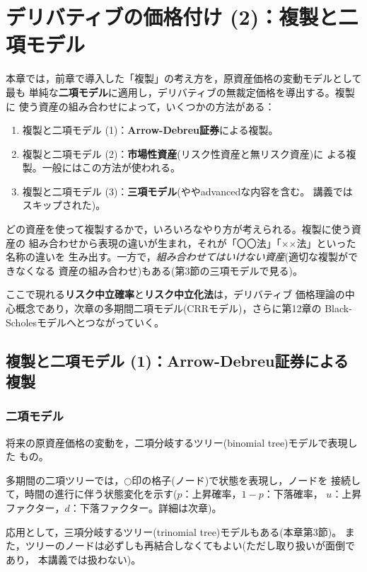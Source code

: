 \chapter{デリバティブの価格付け (2)：複製と二項モデル}

本章では，前章で導入した「複製」の考え方を，原資産価格の変動モデルとして最も
単純な\textbf{二項モデル}に適用し，デリバティブの無裁定価格を導出する。複製に
使う資産の組み合わせによって，いくつかの方法がある：
\begin{enumerate}
\item 複製と二項モデル (1)：\textbf{Arrow-Debreu証券}による複製。
\item 複製と二項モデル (2)：\textbf{市場性資産}(リスク性資産と無リスク資産)に
よる複製。一般にはこの方法が使われる。
\item 複製と二項モデル (3)：\textbf{三項モデル}(ややadvancedな内容を含む。
講義ではスキップされた)。
\end{enumerate}
どの資産を使って複製するかで，いろいろなやり方が考えられる。複製に使う資産の
組み合わせから表現の違いが生まれ，それが「〇〇法」「××法」といった名称の違いを
生み出す。一方で，\emph{組み合わせてはいけない資産}(適切な複製ができなくなる
資産の組み合わせ)もある(第3節の三項モデルで見る)。

ここで現れる\textbf{リスク中立確率}と\textbf{リスク中立化法}は，デリバティブ
価格理論の中心概念であり，次章の多期間二項モデル(CRRモデル)，さらに第12章の
Black-Scholesモデルへとつながっていく。

\section{複製と二項モデル (1)：Arrow-Debreu証券による複製}

\subsection{二項モデル}

\begin{definition}[二項モデル]
将来の原資産価格の変動を，二項分岐するツリー(binomial tree)モデルで表現した
もの。
\end{definition}

多期間の二項ツリーでは，$\bigcirc$印の格子(ノード)で状態を表現し，ノードを
接続して，時間の進行に伴う状態変化を示す($p$：上昇確率，$1-p$：下落確率，
$u$：上昇ファクター，$d$：下落ファクター。詳細は次章)。

応用として，三項分岐するツリー(trinomial tree)モデルもある(本章第3節)。
また，ツリーのノードは必ずしも再結合しなくてもよい(ただし取り扱いが面倒であり，
本講義では扱わない)。

